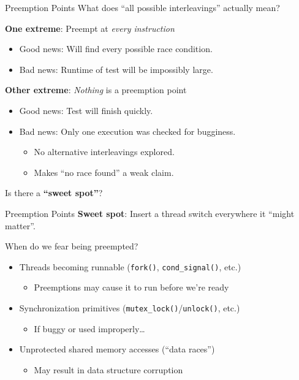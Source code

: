 \documentclass[xcolor=dvipsnames]{beamer}
\begin{document}
\begin{frame}{Preemption Points}
	What does ``all possible interleavings'' actually mean?

	\linegap
	{\bf One extreme}: Preempt at {\em every instruction}
	\begin{itemize}
		\item Good news: Will find every possible race condition.
		\item Bad news: Runtime of test will be impossibly large.
	\end{itemize}
	\linegap

	{\bf Other extreme}: {\em Nothing} is a preemption point
	\begin{itemize}
		\item Good news: Test will finish quickly.
		\item Bad news: Only one execution was checked for bugginess.
		\begin{itemize}
			\item No alternative interleavings explored.
			\item Makes ``no race found'' a weak claim.
		\end{itemize}
	\end{itemize}
	\linegap

	Is there a {\bf ``sweet spot''}?
\end{frame}

\begin{frame}{Preemption Points}
	\textbf{Sweet spot}: Insert a thread switch everywhere it ``might matter''.

	\linegap
	When do we fear being preempted?
	\begin{itemize}
		\item Threads becoming runnable (\texttt{fork()}, \texttt{cond\_signal()}, etc.)
			\begin{itemize}
				\item Preemptions may cause it to run before we're ready
			\end{itemize}
		\item Synchronization primitives (\texttt{mutex\_lock()}/\texttt{unlock()}, etc.)
			\begin{itemize}
				\item If buggy or used improperly\ldots
			\end{itemize}
		\item Unprotected shared memory accesses (``data races'')%
			\begin{itemize}
				\item May result in data structure corruption
			\end{itemize}
	\end{itemize}

\end{frame}
\end{document}
